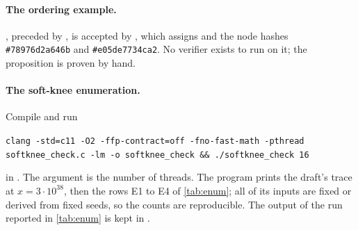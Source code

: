 \paragraph{The ordering example.} , preceded by , is
accepted by , which assigns  and  the node hashes
\texttt{\#78976d2a646b} and \texttt{\#e05de7734ca2}. No verifier exists to run on it; the
proposition is proven by hand.

\paragraph{The soft-knee enumeration.} Compile and run
\begin{center}\footnotesize
\texttt{clang -std=c11 -O2 -ffp-contract=off -fno-fast-math -pthread softknee\_check.c -lm -o
softknee\_check \&\& ./softknee\_check 16}
\end{center}
in . The argument is the number of threads. The program prints the draft's
trace at $x=3\cdot10^{38}$, then the rows E1 to E4 of \cref{tab:enum}; all of its inputs are
fixed or derived from fixed seeds, so the counts are reproducible. The output of the run reported
in \cref{tab:enum} is kept in .
